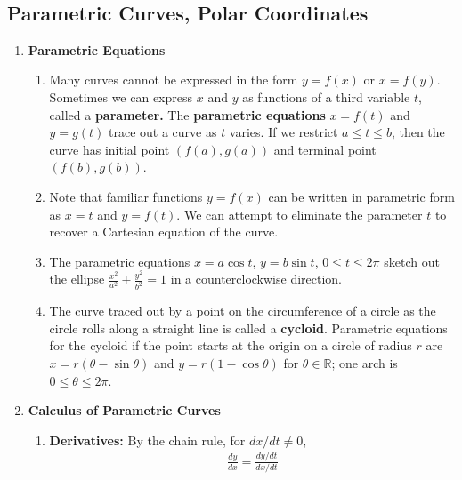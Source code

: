 \documentclass[10pt]{article}
\begin{document}
\date{}
\title{\vspace{-5ex}  \vspace{-5ex}}
\maketitle
\begin{multicols*}{2}
\section{Parametric Curves, Polar Coordinates}
\begin{enumerate}
    \item \textbf{Parametric Equations} 
    \begin{enumerate}
         \item Many curves cannot be expressed in the form $y=f(x)$ or $x=f(y)$. Sometimes we can express $x$ and $y$ as functions of a third variable $t$, called a \textbf{parameter.} The \textbf{parametric equations} $x = f(t)$ and $y=g(t)$ trace out a curve as $t$ varies. If we restrict $a \leq t \leq b$, then the curve has initial point $(f(a), g(a))$ and terminal point $(f(b), g(b))$.
         
         \item Note that familiar functions $y=f(x)$ can be written in parametric form as $x=t$ and $y=f(t)$. We can attempt to eliminate the parameter $t$ to recover a Cartesian equation of the curve.
         
         \item The parametric equations $x = a\cos{t}$, $y = b\sin{t}$, $0 \leq t \leq 2\pi$ sketch out the ellipse $\frac{x^2}{a^2} + \frac{y^2}{b^2}=1$ in a counterclockwise direction.
         
         \item The curve traced out by a point on the circumference of a circle as the circle rolls along a straight line is called a \textbf{cycloid}. Parametric equations for the cycloid if the point starts at the origin on a circle of radius $r$ are $x = r( \theta - \sin{\theta})$ and $y = r(1 - \cos{\theta})$ for $\theta \in \mathbb{R}$; one arch is $0 \leq \theta \leq 2\pi$.
    \end{enumerate}
    
    \item \textbf{Calculus of Parametric Curves}
    \begin{enumerate}
        \item \textbf{Derivatives:} By the chain rule, for $dx / dt \neq 0$,
        \begin{align*}
            \frac{dy}{dx} = \frac{dy / dt}{dx / dt}
        \end{align*}
        

\end{enumerate}
\end{enumerate}
\end{multicols*}
\end{document}
